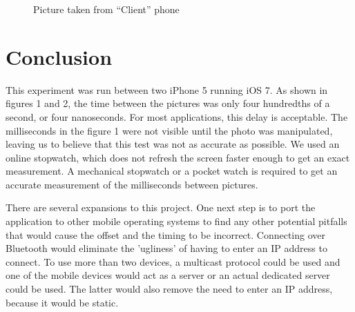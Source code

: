 \documentclass[10pt]{IEEEtran}
\begin{document}
\begin{figure}
{}
\caption{Picture taken from ``Client'' phone}
\label{fig:pic1}
\end{figure}

\section{Conclusion}

This experiment was run between two iPhone 5 running iOS 7. As shown in figures
1 and 2, the time between the pictures was only four hundredths of a second, or
four nanoseconds. For most applications, this delay is acceptable. The
milliseconds in the figure 1 were not visible until the photo was manipulated,
leaving us to believe that this test was not as accurate as possible. We used an
online stopwatch, which does not refresh the screen faster enough to get an
exact measurement. A mechanical stopwatch or a pocket watch is required to get an
accurate measurement of the milliseconds between pictures.

There are several expansions to this project. One next step is to port the
application to other mobile operating systems to find any other potential
pitfalls that would cause the offset and the timing to be incorrect. Connecting
over Bluetooth would eliminate the 'ugliness' of having to enter an IP address
to connect. To use more than two devices, a multicast protocol could be used and
one of the mobile devices would act as a server or an actual dedicated server
could be used. The latter would also remove the need to enter an IP address,
because it would be static. 
\end{document}
